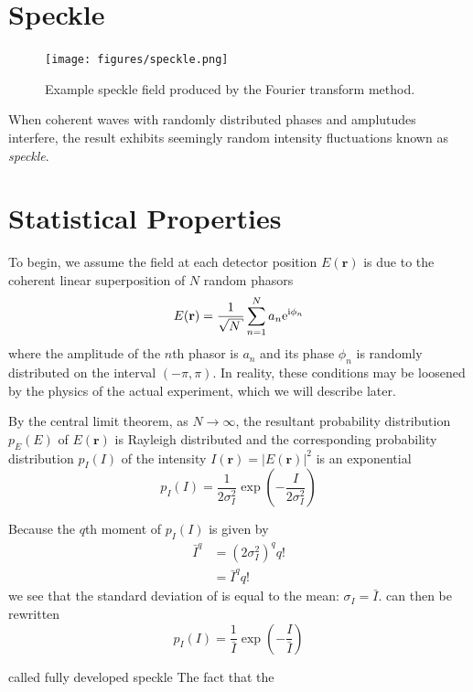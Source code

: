 \section{Speckle}
\begin{figure}[ht]
\centering
\texttt{[image: figures/speckle.png]}
\caption{Example speckle field produced by the Fourier transform method.}
\end{figure}
When coherent waves with randomly distributed phases and amplutudes
interfere, the result exhibits seemingly random intensity fluctuations
known as \textit{speckle}.  


\section{Statistical Properties}
To begin, we assume the field at each detector position $E(\mathbf{r})$ is
due to the coherent linear superposition of $N$ random phasors
\begin{equation}
E(\mathbf{r}) = \frac{1}{\sqrt{N}} \sum_{n=1}^{N} a_n \me^{\mi \phi_n}
\end{equation}
where the amplitude of the $n$th phasor is $a_n$ and its phase $\phi_n$ is
randomly distributed on the interval $(-\pi,\pi)$.  In reality, these
conditions may be loosened by the physics of the actual experiment, which
we will describe later.

By the central limit theorem, as $N\to\infty$, the resultant probability
distribution $p_E(E)$ of $E(\mathbf{r})$ is Rayleigh distributed and the
corresponding probability distribution $p_I(I)$ of the intensity
$I(\mathbf{r})=|E(\mathbf{r})|^2$ is an exponential
\begin{equation}
p_I(I) = \frac{1}{2\sigma_I^2}\exp\left(-\frac{I}{2\sigma_I^2}\right)
\label{eqn:propexp}
\end{equation}

Because the $q$th moment of $p_I(I)$ is given by 
\begin{align}
\bar{I}^q&=(2\sigma_I^2)^q q!\\
         &=\bar{I}^q q!
\end{align}
we see that the standard deviation of is equal to the mean: 
$\sigma_I=\bar{I}$.   can then be rewritten
\begin{equation}
p_I(I) = \frac{1}{\bar{I}}\exp\left(-\frac{I}{\bar{I}}\right)
\end{equation}

called fully developed speckle
The fact that the 

